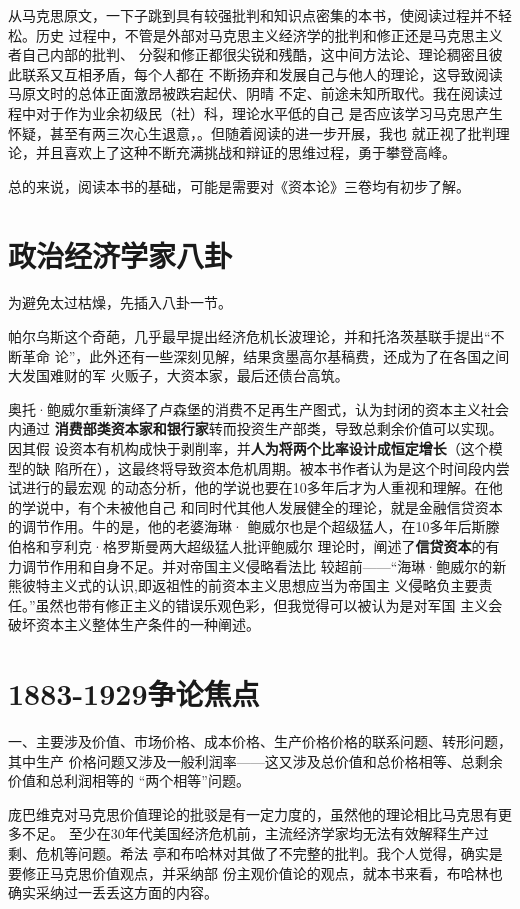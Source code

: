 从马克思原文，一下子跳到具有较强批判和知识点密集的本书，使阅读过程并不轻松。历史
过程中，不管是外部对马克思主义经济学的批判和修正还是马克思主义者自己内部的批判、
分裂和修正都很尖锐和残酷，这中间方法论、理论稠密且彼此联系又互相矛盾，每个人都在
不断扬弃和发展自己与他人的理论，这导致阅读马原文时的总体正面激昂被跌宕起伏、阴晴
不定、前途未知所取代。我在阅读过程中对于作为业余初级民（社）科，理论水平低的自己
是否应该学习马克思产生怀疑，甚至有两三次心生退意，。但随着阅读的进一步开展，我也
就正视了批判理论，并且喜欢上了这种不断充满挑战和辩证的思维过程，勇于攀登高峰。

总的来说，阅读本书的基础，可能是需要对《资本论》三卷均有初步了解。

\section{政治经济学家八卦}

为避免太过枯燥，先插入八卦一节。

帕尔乌斯这个奇葩，几乎最早提出经济危机长波理论，并和托洛茨基联手提出“不断革命
论”，此外还有一些深刻见解，结果贪墨高尔基稿费，还成为了在各国之间大发国难财的军
火贩子，大资本家，最后还债台高筑。

奥托·鲍威尔重新演绎了卢森堡的消费不足再生产图式，认为封闭的资本主义社会内通过
\textbf{消费部类资本家和银行家}转而投资生产部类，导致总剩余价值可以实现。因其假
设资本有机构成快于剥削率，并\textbf{人为将两个比率设计成恒定增长}（这个模型的缺
陷所在），这最终将导致资本危机周期。被本书作者认为是这个时间段内尝试进行的最宏观
的动态分析，他的学说也要在10多年后才为人重视和理解。在他的学说中，有个未被他自己
和同时代其他人发展健全的理论，就是金融信贷资本的调节作用。牛的是，他的老婆海琳·
鲍威尔也是个超级猛人，在10多年后斯滕伯格和亨利克·格罗斯曼两大超级猛人批评鲍威尔
理论时，阐述了\textbf{信贷资本}的有力调节作用和自身不足。并对帝国主义侵略看法比
较超前——“海琳·鲍威尔的新熊彼特主义式的认识,即返祖性的前资本主义思想应当为帝国主
义侵略负主要责任。”虽然也带有修正主义的错误乐观色彩，但我觉得可以被认为是对军国
主义会破坏资本主义整体生产条件的一种阐述。

\section{1883-1929争论焦点}

一、主要涉及价值、市场价格、成本价格、生产价格价格的联系问题、转形问题，其中生产
价格问题又涉及一般利润率——这又涉及总价值和总价格相等、总剩余价值和总利润相等的
“两个相等”问题。

庞巴维克对马克思价值理论的批驳是有一定力度的，虽然他的理论相比马克思有更多不足。
至少在30年代美国经济危机前，主流经济学家均无法有效解释生产过剩、危机等问题。希法
亭和布哈林对其做了不完整的批判。我个人觉得，确实是要修正马克思价值观点，并采纳部
份主观价值论的观点，就本书来看，布哈林也确实采纳过一丢丢这方面的内容。

